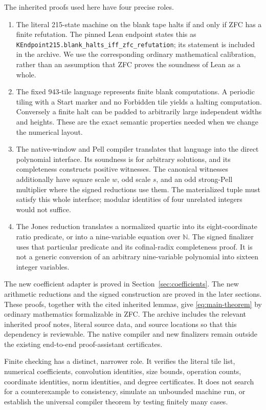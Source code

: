 \documentclass[11pt]{article}
\theoremstyle{definition}\newtheorem{definition}[theorem]{Definition}
\theoremstyle{remark}\newtheorem{remark}[theorem]{Remark}
\newcommand{\N}{\mathbb N}\newcommand{\Z}{\mathbb Z}\newcommand{\Q}{\mathbb Q}
\begin{document}
The inherited proofs used here have four precise roles.
\begin{enumerate}
\item The literal 215-state machine on the blank tape halts if and only if
ZFC has a finite refutation. The pinned Lean endpoint states this as
\texttt{KEndpoint215.blank\_halts\_iff\_zfc\_refutation}; its statement is
included in the archive. We use the corresponding ordinary mathematical
calibration, rather than an assumption that ZFC proves the soundness of
Lean as a whole.
\item The fixed 943-tile language represents finite blank computations.
A periodic tiling with a Start marker and no Forbidden tile yields a
halting computation. Conversely a finite halt can be padded to arbitrarily
large independent widths and heights. These are the exact semantic
properties needed when we change the numerical layout.
\item The native-window and Pell compiler translates that language into
the direct polynomial interface. Its soundness is for arbitrary
solutions, and its completeness constructs positive witnesses. The
canonical witnesses additionally have square scale $w$, odd scale $s$,
and an odd strong-Pell multiplier where the signed reductions use them.
The materialized tuple must satisfy this whole interface; modular
identities of four unrelated integers would not suffice.
\item The Jones reduction translates a normalized quartic into its
eight-coordinate ratio predicate, or into a nine-variable equation over
$\N$. The signed finalizer uses that particular predicate and its
cofinal-radix completeness proof. It is not a generic conversion of an
arbitrary nine-variable polynomial into sixteen integer variables.
\end{enumerate}

The new coefficient adapter is proved in Section~\ref{sec:coefficients}.
The new arithmetic reductions and the signed construction are proved in
the later sections. These proofs, together with the cited inherited
lemmas, give \eqref{eq:main-theorem} by ordinary mathematics formalizable
in ZFC. The archive includes the relevant inherited proof notes, literal
source data, and source locations so that this dependency is reviewable.
The native compiler and new finalizers remain outside the existing
end-to-end proof-assistant certificates.

Finite checking has a distinct, narrower role. It verifies the literal
tile list, numerical coefficients, convolution identities, size bounds,
operation counts, coordinate identities, norm identities, and degree
certificates. It does not search for a counterexample to consistency,
simulate an unbounded machine run, or establish the universal compiler
theorem by testing finitely many cases.
\end{document}
